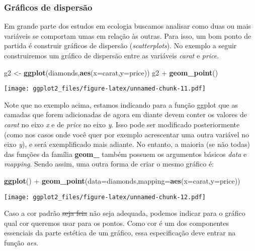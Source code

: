 \documentclass[]{article}
\newenvironment{Shaded}{\begin{snugshade}}{\end{snugshade}}
\newcommand{\KeywordTok}[1]{\textcolor[rgb]{0.13,0.29,0.53}{\textbf{{#1}}}}
\newcommand{\DataTypeTok}[1]{\textcolor[rgb]{0.13,0.29,0.53}{{#1}}}
\newcommand{\StringTok}[1]{\textcolor[rgb]{0.31,0.60,0.02}{{#1}}}
\newcommand{\NormalTok}[1]{{#1}}
\begin{document}
\subsubsection{Gráficos de dispersão}\label{graficos-de-dispersao}

Em grande parte dos estudos em ecologia buscamos analisar como duas ou
mais variáveis se comportam umas em relação às outras. Para isso, um bom
ponto de partida é construir gráficos de dispersão
(\emph{scatterplots}). No exemplo a seguir construiremos um gráfico de
dispersão entre as variáveis \emph{carat} e \emph{price}.

\begin{Shaded}
\begin{Highlighting}[]
\NormalTok{g2 <-}\StringTok{ }\KeywordTok{ggplot}\NormalTok{(diamonds,}\KeywordTok{aes}\NormalTok{(}\DataTypeTok{x=}\NormalTok{carat,}\DataTypeTok{y=}\NormalTok{price))}
\NormalTok{g2 +}\StringTok{ }\KeywordTok{geom_point}\NormalTok{()}
\end{Highlighting}
\end{Shaded}

\texttt{[image: ggplot2\_files/figure-latex/unnamed-chunk-11.pdf]}

Note que no exemplo acima, estamos indicando para a função ggplot que as
camadas que forem adicionadas de agora em diante devem conter os valores
de \emph{carat} no eixo \emph{x} e de \emph{price} no eixo \emph{y}.
Isso pode ser modificado posteriormente (como nos casos onde você quer
por exemplo acrescentar uma outra variável no eixo \emph{y}), e será
exemplificado mais adiante. No entanto, a maioria (se não todas) das
funções da família \textbf{geom\_} também possuem os argumentos básicos
\emph{data} e \emph{mapping}. Sendo assim, uma outra forma de criar o
mesmo gráfico é:

\begin{Shaded}
\begin{Highlighting}[]
\KeywordTok{ggplot}\NormalTok{() +}\StringTok{ }\KeywordTok{geom_point}\NormalTok{(}\DataTypeTok{data=}\NormalTok{diamonds,}\DataTypeTok{mapping=}\KeywordTok{aes}\NormalTok{(}\DataTypeTok{x=}\NormalTok{carat,}\DataTypeTok{y=}\NormalTok{price))}
\end{Highlighting}
\end{Shaded}

\texttt{[image: ggplot2\_files/figure-latex/unnamed-chunk-12.pdf]}

Caso a cor padrão \sout{seja feia} não seja adequada, podemos indicar
para o gráfico qual cor queremos usar para os pontos. Como cor é um dos
componentes essenciais da parte estética de um gráfico, essa
especificação deve entrar na função \emph{aes}.
\end{document}
